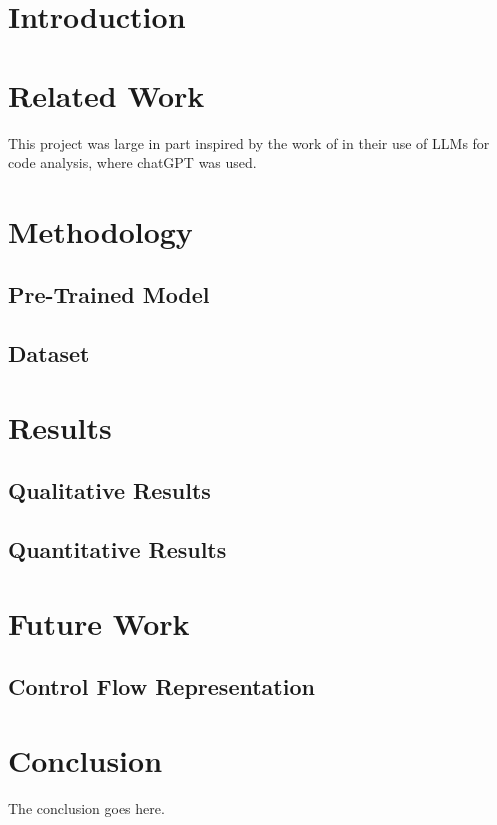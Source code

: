 \section{Introduction}




\section{Related Work}

This project was large in part inspired by the work of \cite{fang2024large} in their use of LLMs for code analysis, where chatGPT was used.

\section{Methodology}

\subsection{Pre-Trained Model}

\subsection{Dataset}

\section{Results}

\subsection{Qualitative Results}
\subsection{Quantitative Results}


\section{Future Work}

\subsection{Control Flow Representation}

\section{Conclusion}
The conclusion goes here.
